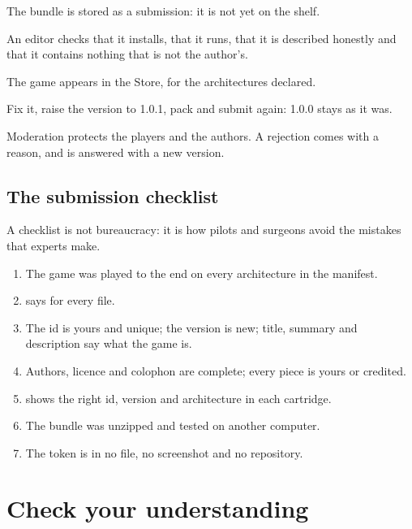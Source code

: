 \begin{description}[style=nextline,leftmargin=1.5em]
\item[Pending.] The bundle is stored as a submission: it is not yet on the
  shelf.
\item[Review.] An editor checks that it installs, that it runs, that it is
  described honestly and that it contains nothing that is not the author's.
\item[Published.] The game appears in the Store, for the architectures
  declared.
\item[A bug?] Fix it, raise the version to 1.0.1, pack and submit again:
  1.0.0 stays as it was.
\end{description}

Moderation protects the players and the authors. A rejection comes with a
reason, and is answered with a new version.

\subsection{The submission checklist}

A checklist is not bureaucracy: it is how pilots and surgeons avoid the
mistakes that experts make.

\begin{enumerate}
\item The game was played to the end on every architecture in the manifest.
\item {} says  for every
  file.
\item The id is yours and unique; the version is new; title, summary and
  description say what the game is.
\item Authors, licence and colophon are complete; every piece is yours or
  credited.
\item {} shows the right id, version and architecture in
  each cartridge.
\item The bundle was unzipped and tested on another computer.
\item The token is in no file, no screenshot and no repository.
\end{enumerate}



\section{Check your understanding}

